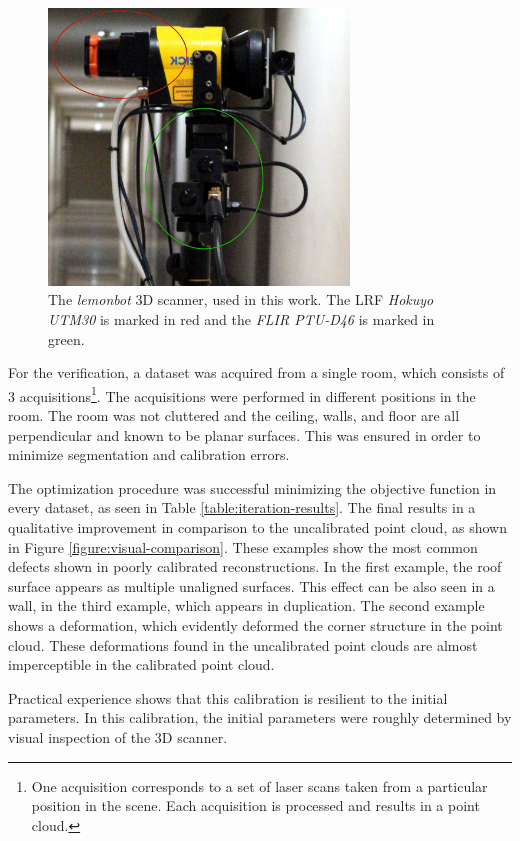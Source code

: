 \documentclass[conference]{IEEEtran}
\begin{document}
\begin{figure}[h]
    \centering
    \includegraphics[width=8cm]{images/lemonbot-head}
    \caption{The \textit{lemonbot} 3D scanner, used in this work. The LRF \textit{Hokuyo UTM30} is marked in red and the \textit{FLIR PTU-D46} is marked in green.}
    \label{figure:lemonbot}
\end{figure}

For the verification, a dataset was acquired from a single room, which consists of 3 acquisitions\footnote{One acquisition corresponds to a set of laser scans taken from a particular position in the scene. Each acquisition is processed and results in a point cloud.}. The acquisitions were performed in different positions in the room. The room was not cluttered and the ceiling, walls, and floor are all perpendicular and known to be planar surfaces. This was ensured in order to minimize segmentation and calibration errors.

The optimization procedure was successful minimizing the objective function in every dataset, as seen in Table \ref{table:iteration-results}. The final results in a qualitative improvement in comparison to the uncalibrated point cloud, as shown in Figure \ref{figure:visual-comparison}. These examples show the most common defects shown in poorly calibrated reconstructions. In the first example, the roof surface appears as multiple unaligned surfaces. This effect can be also seen in a wall, in the third example, which appears in duplication. The second example shows a deformation, which evidently deformed the corner structure in the point cloud. These deformations found in the uncalibrated point clouds are almost imperceptible in the calibrated point cloud.

Practical experience shows that this calibration is resilient to the initial parameters. In this calibration, the initial parameters were roughly determined by visual inspection of the 3D scanner. 
\end{document}
